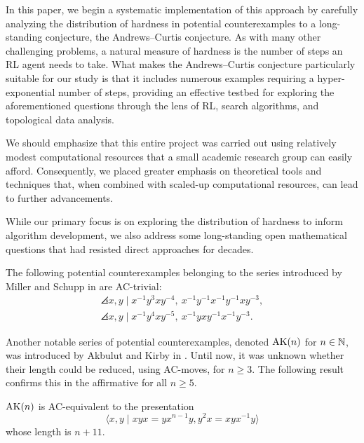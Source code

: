 In this paper, we begin a systematic implementation of this approach by carefully analyzing the distribution of hardness in potential counterexamples to a long-standing conjecture, the Andrews--Curtis conjecture. As with many other challenging problems, a natural measure of hardness is the number of steps an RL agent needs to take. What makes the Andrews--Curtis conjecture particularly suitable for our study is that it includes numerous examples requiring a hyper-exponential number of steps, providing an effective testbed for exploring the aforementioned questions through the lens of RL, search algorithms, and topological data analysis.

We should emphasize that this entire project was carried out using relatively modest computational resources that a small academic research group can easily afford. Consequently, we placed greater emphasis on theoretical tools and techniques that, when combined with scaled-up computational resources, can lead to further advancements.

While our primary focus is on exploring the distribution of hardness to inform algorithm development, we also address some long-standing open mathematical questions that had resisted direct approaches for decades.

\begin{theorem}\label{thm:MS}
	The following potential counterexamples belonging to the series introduced by Miller and Schupp in \cite{Miller--Schupp} are AC-trivial:
	\begin{gather*}
		\angles{x, y \mid x^{-1} y^3 x y^{-4} , \ x^{-1} y^{-1} x^{-1} y^{-1} x y^{-3}}, \\
		\angles{x, y \mid x^{-1} y^4 x y^{-5} , \ x^{-1} y x y^{-1} x^{-1} y^{-3}}.
	\end{gather*}
\end{theorem}

\medskip Another notable series of potential counterexamples, denoted $\text{AK}(n)$ for $n \in \mathbb{N}$, was introduced by Akbulut and Kirby in \cite{Akbulut--Kirby}.
Until now, it was unknown whether their length could be reduced, using AC-moves, for $n \geq 3$.
The following result confirms this in the affirmative for all $n \geq 5$.

\begin{theorem}
    $\text{AK}(n)$ is AC-equivalent to the presentation
    \[
    \langle x,y \mid xyx=yx^{n-1}y, y^2x=xyx^{-1}y \rangle
    \]
    whose length is $n+11$.
\end{theorem}

